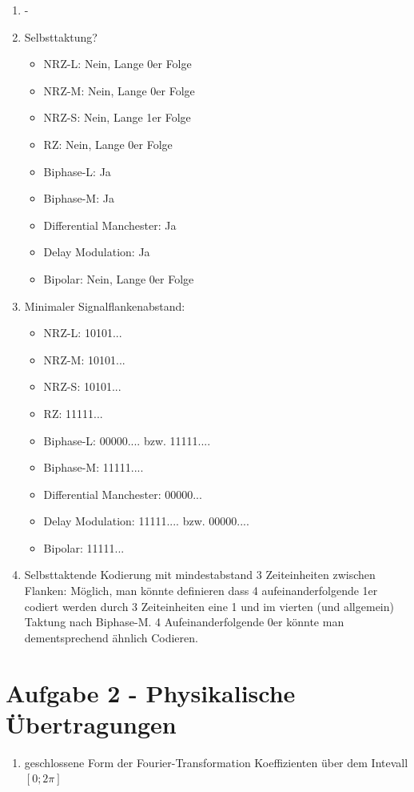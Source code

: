 \documentclass{scrartcl}
\begin{document}
\begin{enumerate}
    \item -
    \item Selbsttaktung?
        \begin{itemize}
            \item NRZ-L: Nein, Lange 0er Folge
            \item NRZ-M: Nein, Lange 0er Folge
            \item NRZ-S: Nein, Lange 1er Folge
            \item RZ: Nein, Lange 0er Folge
            \item Biphase-L: Ja
            \item Biphase-M: Ja
            \item Differential Manchester: Ja
            \item Delay Modulation: Ja
            \item Bipolar: Nein, Lange 0er Folge
        \end{itemize}
    \item Minimaler Signalflankenabstand:
        \begin{itemize}
            \item NRZ-L: 10101...
            \item NRZ-M: 10101...
            \item NRZ-S: 10101...
            \item RZ: 11111...
            \item Biphase-L: 00000.... bzw. 11111....
            \item Biphase-M: 11111....
            \item Differential Manchester: 00000...
            \item Delay Modulation: 11111.... bzw. 00000....
            \item Bipolar: 11111...
        \end{itemize}
    \item Selbsttaktende Kodierung mit mindestabstand 3 Zeiteinheiten zwischen Flanken:
        Möglich, man könnte definieren dass 4 aufeinanderfolgende 1er codiert werden
        durch 3 Zeiteinheiten eine 1 und im vierten (und allgemein) Taktung nach Biphase-M.
        4 Aufeinanderfolgende 0er könnte man dementsprechend ähnlich Codieren.
\end{enumerate}



\section*{Aufgabe 2 - Physikalische Übertragungen}
\begin{enumerate}
    \item geschlossene Form der Fourier-Transformation Koeffizienten über dem Intevall $[0;2\pi]$

\end{enumerate}
\end{document}
